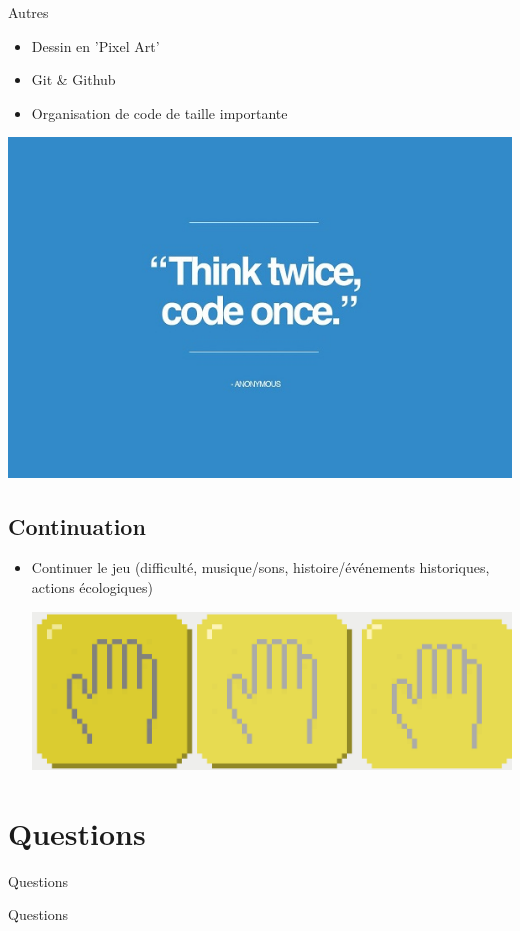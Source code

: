 \documentclass[11pt]{beamer}
\newcommand{\pauseditemize}{\pause \begin{itemize}[<+->]}
\begin{document}
\begin{frame}{Autres}

\pauseditemize
	\item Dessin en 'Pixel Art'
	\item Git \& Github
	\item Organisation de code de taille importante
\end{itemize}

\pause
\begin{center}
	\includegraphics[scale=.3]{../images/Think-Twice-Code-Once}
\end{center}

\end{frame}

\subsection{Continuation}

\begin{frame}

\pauseditemize
	\item Continuer le jeu (difficulté, musique/sons, histoire/événements historiques, actions écologiques)
	\begin{center} 
		\includegraphics[scale=.08]{../images/ecoActions} 
	\end{center}
\end{itemize}

\end{frame}

\section{Questions}

\begin{frame}{Questions}
	\begin{center}
	{\LARGE Questions}
	\end{center}
\end{frame}
\end{document}

